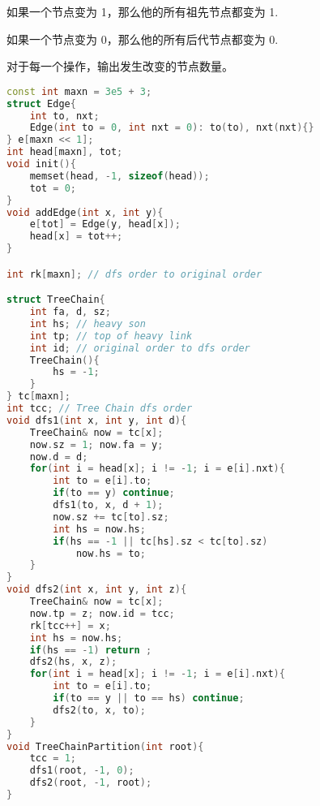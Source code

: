 如果一个节点变为 1，那么他的所有祖先节点都变为 1.

如果一个节点变为 0，那么他的所有后代节点都变为 0.

对于每一个操作，输出发生改变的节点数量。


\begin{lstlisting}[language=C++]
const int maxn = 3e5 + 3;
struct Edge{
    int to, nxt;
    Edge(int to = 0, int nxt = 0): to(to), nxt(nxt){}
} e[maxn << 1];
int head[maxn], tot;
void init(){
    memset(head, -1, sizeof(head));
    tot = 0;
}
void addEdge(int x, int y){
    e[tot] = Edge(y, head[x]);
    head[x] = tot++;
}

int rk[maxn]; // dfs order to original order

struct TreeChain{
    int fa, d, sz;
    int hs; // heavy son
    int tp; // top of heavy link
    int id; // original order to dfs order
    TreeChain(){
        hs = -1;
    }
} tc[maxn];
int tcc; // Tree Chain dfs order
void dfs1(int x, int y, int d){
    TreeChain& now = tc[x];
    now.sz = 1; now.fa = y;
    now.d = d;
    for(int i = head[x]; i != -1; i = e[i].nxt){
        int to = e[i].to;
        if(to == y) continue;
        dfs1(to, x, d + 1);
        now.sz += tc[to].sz;
        int hs = now.hs;
        if(hs == -1 || tc[hs].sz < tc[to].sz)
            now.hs = to;
    }
}
void dfs2(int x, int y, int z){
    TreeChain& now = tc[x];
    now.tp = z; now.id = tcc;
    rk[tcc++] = x;
    int hs = now.hs;
    if(hs == -1) return ;
    dfs2(hs, x, z);
    for(int i = head[x]; i != -1; i = e[i].nxt){
        int to = e[i].to;
        if(to == y || to == hs) continue;
        dfs2(to, x, to);
    }
}
void TreeChainPartition(int root){
    tcc = 1;
    dfs1(root, -1, 0);
    dfs2(root, -1, root);
}


\end{lstlisting}

